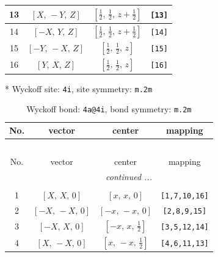 \documentclass[fleqn,8pt]{jsarticle}
\begin{document}
\begin{longtable}{cccc}
13 & $\left[ X,\, - Y,\, Z \right]$ & $\left[ \frac{1}{2},\, \frac{1}{2},\, z + \frac{1}{2} \right]$ & {\tt [13]} \\ \hline
14 & $\left[ - X,\, Y,\, Z \right]$ & $\left[ \frac{1}{2},\, \frac{1}{2},\, z + \frac{1}{2} \right]$ & {\tt [14]} \\ \hline
15 & $\left[ - Y,\, - X,\, Z \right]$ & $\left[ \frac{1}{2},\, \frac{1}{2},\, z \right]$ & {\tt [15]} \\ \hline
16 & $\left[ Y,\, X,\, Z \right]$ & $\left[ \frac{1}{2},\, \frac{1}{2},\, z \right]$ & {\tt [16]} \\
\end{longtable}
* Wyckoff site: {\tt 4i}, site symmetry: {\tt m.2m}
\renewcommand{\arraystretch}{1.2}
\begin{longtable}{cccc}
\caption{Wyckoff bond: {\tt 4a@4i}, bond symmetry: {\tt m.2m}}
 \\
 \hline \hline
No. & vector & center & mapping \\ \hline \endfirsthead

\multicolumn{3}{l}{\tablename\ \thetable{}} \\
 \hline \hline
No. & vector & center & mapping \\ \hline \endhead

 \hline \hline
\multicolumn{3}{r}{\footnotesize\it continued ...} \\ \endfoot

 \hline \hline
\multicolumn{3}{r}{} \\ \endlastfoot

1 & $\left[ X,\, X,\, 0 \right]$ & $\left[ x,\, x,\, 0 \right]$ & {\tt [1,7,10,16]} \\ \hline
2 & $\left[ - X,\, - X,\, 0 \right]$ & $\left[ - x,\, - x,\, 0 \right]$ & {\tt [2,8,9,15]} \\ \hline
3 & $\left[ - X,\, X,\, 0 \right]$ & $\left[ - x,\, x,\, \frac{1}{2} \right]$ & {\tt [3,5,12,14]} \\ \hline
4 & $\left[ X,\, - X,\, 0 \right]$ & $\left[ x,\, - x,\, \frac{1}{2} \right]$ & {\tt [4,6,11,13]} \\
\end{longtable}
\renewcommand{\arraystretch}{1.2}
\end{document}
